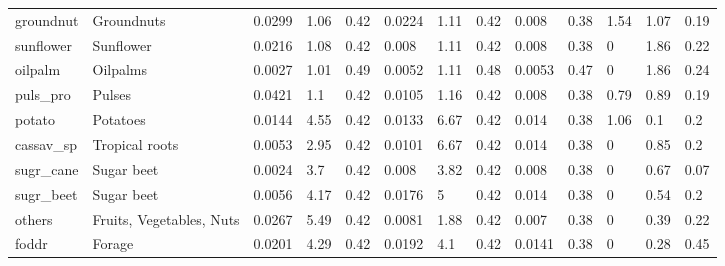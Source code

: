\documentclass[gc, manuscript]{copernicus}
\begin{document}
\begin{table}[h]
\begin{tabular}{lllllllllllll}
groundnut  & Groundnuts                      & 0.0299      & 1.06       & 0.42      & 0.0224        & 1.11         & 0.42       & 0.008                & 0.38               & 1.54                     & 1.07                     & 0.19 \\
sunflower  & Sunflower                       & 0.0216      & 1.08       & 0.42      & 0.008         & 1.11         & 0.42       & 0.008                & 0.38               & 0                        & 1.86                     & 0.22 \\
oilpalm    & Oilpalms                        & 0.0027      & 1.01       & 0.49      & 0.0052        & 1.11         & 0.48       & 0.0053               & 0.47               & 0                        & 1.86                     & 0.24 \\
puls\_pro  & Pulses                          & 0.0421      & 1.1        & 0.42      & 0.0105        & 1.16         & 0.42       & 0.008                & 0.38               & 0.79                     & 0.89                     & 0.19 \\
potato     & Potatoes                        & 0.0144      & 4.55       & 0.42      & 0.0133        & 6.67         & 0.42       & 0.014                & 0.38               & 1.06                     & 0.1                      & 0.2  \\
cassav\_sp & Tropical roots                  & 0.0053      & 2.95       & 0.42      & 0.0101        & 6.67         & 0.42       & 0.014                & 0.38               & 0                        & 0.85                     & 0.2  \\
sugr\_cane & Sugar beet                      & 0.0024      & 3.7        & 0.42      & 0.008         & 3.82         & 0.42       & 0.008                & 0.38               & 0                        & 0.67                     & 0.07 \\
sugr\_beet & Sugar beet                      & 0.0056      & 4.17       & 0.42      & 0.0176        & 5            & 0.42       & 0.014                & 0.38               & 0                        & 0.54                     & 0.2  \\
others     & Fruits, Vegetables, Nuts          & 0.0267      & 5.49       & 0.42      & 0.0081        & 1.88         & 0.42       & 0.007                & 0.38               & 0                        & 0.39                     & 0.22 \\
foddr      & Forage                          & 0.0201      & 4.29       & 0.42      & 0.0192        & 4.1          & 0.42       & 0.0141               & 0.38               & 0                        & 0.28                     & 0.45 \\

\end{tabular}
\end{table}
\end{document}
